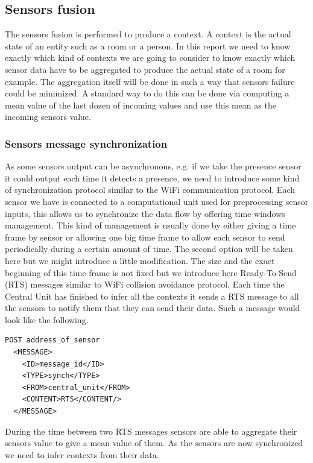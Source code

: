 \documentclass{acm_proc_article-sp}
\begin{document}
\subsection{Sensors fusion}
The sensors fusion is performed to produce a context. A context is the actual state of an entity such as a room or a person. 
In this report we need to know exactly which kind of contexts we are going to consider to know exactly which sensor data have to be aggregated to produce the actual state of a room for example. 
The aggregation itself will be done in such a way that sensors failure could be minimized.
A standard way to do this can be done via computing a mean value of the last dozen of incoming values and use this mean as the incoming sensors value.
\subsubsection{Sensors message synchronization}
As some sensors output can be asynchronous, e.g. if we take the presence sensor it could output each time it detects a presence, we need to introduce some kind of synchronization protocol similar to the WiFi communication protocol.
Each sensor we have is connected to a computational unit used for preprocessing sensor inputs, this allows us to synchronize the data flow by offering time windows management.
This kind of management is usually done by either giving a time frame by sensor or allowing one big time frame to allow each sensor to send periodically during a certain amount of time.
The second option will be taken here but we might introduce a little modification. 
The size and the exact beginning of this time frame is not fixed but we introduce here Ready-To-Send (RTS) messages similar to WiFi collision avoidance protocol.
Each time the Central Unit has finished to infer all the contexts it sends a RTS message to all the sensors to notify them that they can send their data.
Such a message would look like the following.

\begin{minipage}{\linewidth}
\begin{lstlisting}
POST address_of_sensor 
  <MESSAGE>
    <ID>message_id</ID>
    <TYPE>synch</TYPE>
    <FROM>central_unit</FROM>
    <CONTENT>RTS</CONTENT/>
  </MESSAGE> 
\end{lstlisting}
\end{minipage}

During the time between two RTS messages sensors are able to aggregate their sensors value to give a mean value of them.
As the sensors are now synchronized we need to infer contexts from their data.
\end{document}
